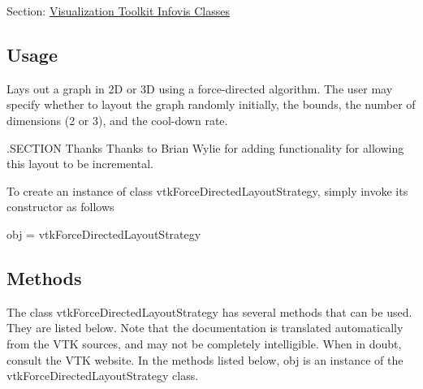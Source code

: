 Section\-: \hyperlink{sec_vtkinfovis}{Visualization Toolkit Infovis Classes} \hypertarget{vtkwidgets_vtkxyplotwidget_Usage}{}\subsection{Usage}\label{vtkwidgets_vtkxyplotwidget_Usage}
Lays out a graph in 2\-D or 3\-D using a force-\/directed algorithm. The user may specify whether to layout the graph randomly initially, the bounds, the number of dimensions (2 or 3), and the cool-\/down rate.

.S\-E\-C\-T\-I\-O\-N Thanks Thanks to Brian Wylie for adding functionality for allowing this layout to be incremental.

To create an instance of class vtk\-Force\-Directed\-Layout\-Strategy, simply invoke its constructor as follows \begin{DoxyVerb}  obj = vtkForceDirectedLayoutStrategy
\end{DoxyVerb}
 \hypertarget{vtkwidgets_vtkxyplotwidget_Methods}{}\subsection{Methods}\label{vtkwidgets_vtkxyplotwidget_Methods}
The class vtk\-Force\-Directed\-Layout\-Strategy has several methods that can be used. They are listed below. Note that the documentation is translated automatically from the V\-T\-K sources, and may not be completely intelligible. When in doubt, consult the V\-T\-K website. In the methods listed below, {\ttfamily obj} is an instance of the vtk\-Force\-Directed\-Layout\-Strategy class. 
